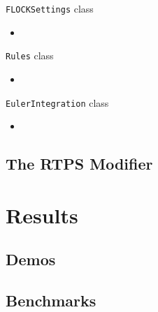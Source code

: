 \documentclass[red]{beamer}
\begin{document}
\begin{frame}{\texttt{FLOCKSettings} class}
	\begin{itemize}
		\pause \item
	\end{itemize}
\end{frame}

\begin{frame}{\texttt{Rules} class}
	\begin{itemize}
		\pause \item
	\end{itemize}
\end{frame}

\begin{frame}{\texttt{EulerIntegration} class}
	\begin{itemize}
		\pause \item
	\end{itemize}
\end{frame}

\subsection{The RTPS Modifier}






\section{Results}

\subsection{Demos}



\subsection{Benchmarks}
\end{document}
